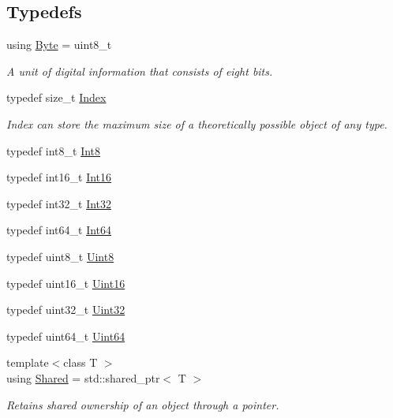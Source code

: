 \subsection*{Typedefs}
\begin{DoxyCompactItemize}
\item 
using \hyperlink{namespaceostk_1_1core_1_1types_a0733eebee5d093ea04df859028e2649f}{Byte} = uint8\+\_\+t
\begin{DoxyCompactList}\small\item\em A unit of digital information that consists of eight bits. \end{DoxyCompactList}\item 
typedef size\+\_\+t \hyperlink{namespaceostk_1_1core_1_1types_a6e63c1b15b2e5bc87a43771c09fa913a}{Index}
\begin{DoxyCompactList}\small\item\em Index can store the maximum size of a theoretically possible object of any type. \end{DoxyCompactList}\item 
typedef int8\+\_\+t \hyperlink{namespaceostk_1_1core_1_1types_ad9a0dc0d53ae20e4a53ab8a250d56de3}{Int8}
\item 
typedef int16\+\_\+t \hyperlink{namespaceostk_1_1core_1_1types_a88d90d717aac6c91b44fd07ec87cf3da}{Int16}
\item 
typedef int32\+\_\+t \hyperlink{namespaceostk_1_1core_1_1types_abc111a0d1129d03945e9bc2e975158ab}{Int32}
\item 
typedef int64\+\_\+t \hyperlink{namespaceostk_1_1core_1_1types_ad98fda0b92ffe48abffa77d65cb42113}{Int64}
\item 
typedef uint8\+\_\+t \hyperlink{namespaceostk_1_1core_1_1types_a46cad24446bacb3f8bf605a53671ab24}{Uint8}
\item 
typedef uint16\+\_\+t \hyperlink{namespaceostk_1_1core_1_1types_aacabe89aeeaa93c0bbfe3b4e04454e45}{Uint16}
\item 
typedef uint32\+\_\+t \hyperlink{namespaceostk_1_1core_1_1types_a821738d6849fcc24698839971deccbb9}{Uint32}
\item 
typedef uint64\+\_\+t \hyperlink{namespaceostk_1_1core_1_1types_a0c1d18a4608c61f9cac139054b725689}{Uint64}
\item 
{\footnotesize template$<$class T $>$ }\\using \hyperlink{namespaceostk_1_1core_1_1types_a3e7aff47b81452ed1f18f6d8f6c90140}{Shared} = std\+::shared\+\_\+ptr$<$ T $>$
\begin{DoxyCompactList}\small\item\em Retains shared ownership of an object through a pointer. \end{DoxyCompactList}\item 

\end{DoxyCompactItemize}
